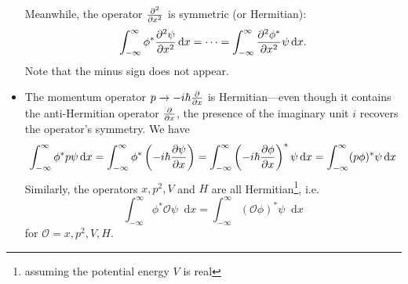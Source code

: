 \documentclass[11pt, a4paper]{article}
\newcommand{\diff}{\mathop{}\!\mathrm{d}} %
\renewcommand{\O}{\mathcal{O}}  %
\newcommand{\p}{\psi}  %
\begin{document}
\begin{itemize}
	Meanwhile, the operator $ \pdv[2]{}{x} $ is symmetric (or Hermitian):
	\begin{equation*}
		\int_{-\infty}^{\infty} \phi^{*} \pdv[2]{\p}{x} \diff x = \cdots = \int_{-\infty}^{\infty} \pdv[2]{\phi^{*}}{x} \p \diff x.
	\end{equation*}
	Note that the minus sign does not appear.
	
	\item The momentum operator $ p \to -i\hbar \pdv{x} $ is Hermitian---even though it contains the anti-Hermitian operator $ \pdv{x} $, the presence of the imaginary unit $ i $ recovers the operator's symmetry. We have
	\begin{equation*}
		\int_{-\infty}^{\infty} \phi^{*} p \psi \diff x = \int_{-\infty}^{\infty} \phi^{*} \left(-i\hbar \pdv{\p}{x}\right) = \int_{-\infty}^{\infty} \left(-i\hbar \pdv{\phi}{x}\right)^{*} \p \diff x = \int_{-\infty}^{\infty} (p \phi)^{*} \psi \diff x
	\end{equation*}
	Similarly, the operators $ x, p^{2}, V $ and $ H $ are all Hermitian\footnote{assuming the potential energy $ V $ is real}, i.e.
	\begin{equation*}
		\int_{-\infty}^{\infty} \phi^{*}\O \psi \diff x = \int_{-\infty}^{\infty} (\O \phi)^{*}\p \diff x
	\end{equation*}
	for $ \O = x, p^{2}, V, H $.
	
\end{itemize}
\end{document}
